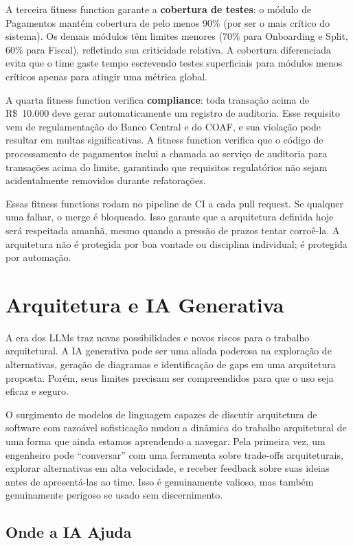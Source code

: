 A terceira fitness function garante a \textbf{cobertura de testes}: o módulo de
Pagamentos mantém cobertura de pelo menos 90\% (por ser o mais crítico do
sistema). Os demais módulos têm limites menores (70\% para Onboarding e Split,
60\% para Fiscal), refletindo sua criticidade relativa. A cobertura diferenciada
evita que o time gaste tempo escrevendo testes superficiais para módulos menos
críticos apenas para atingir uma métrica global.

A quarta fitness function verifica \textbf{compliance}: toda transação acima de
R\$~10.000 deve gerar automaticamente um registro de auditoria. Esse requisito
vem de regulamentação do Banco Central e do COAF, e sua violação pode resultar
em multas significativas. A fitness function verifica que o código de
processamento de pagamentos inclui a chamada ao serviço de auditoria para
transações acima do limite, garantindo que requisitos regulatórios não sejam
acidentalmente removidos durante refatorações.

Essas fitness functions rodam no pipeline de CI a cada pull request. Se qualquer
uma falhar, o merge é bloqueado. Isso garante que a arquitetura definida hoje
será respeitada amanhã, mesmo quando a pressão de prazos tentar corroê-la. A
arquitetura não é protegida por boa vontade ou disciplina individual; é
protegida por automação.


\section{Arquitetura e IA Generativa}

A era dos LLMs traz novas possibilidades e novos riscos para o trabalho
arquitetural. A IA generativa pode ser uma aliada poderosa na exploração de
alternativas, geração de diagramas e identificação de gaps em uma arquitetura
proposta. Porém, seus limites precisam ser compreendidos para que o uso seja
eficaz e seguro.

O surgimento de modelos de linguagem capazes de discutir arquitetura de
software com razoável sofisticação mudou a dinâmica do trabalho arquitetural
de uma forma que ainda estamos aprendendo a navegar. Pela primeira vez, um
engenheiro pode ``conversar'' com uma ferramenta sobre trade-offs
arquiteturais, explorar alternativas em alta velocidade, e receber feedback
sobre suas ideias antes de apresentá-las ao time. Isso é genuinamente valioso,
mas também genuinamente perigoso se usado sem discernimento.

\subsection{Onde a IA Ajuda}

